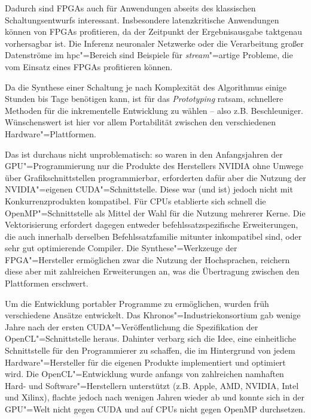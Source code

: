 Dadurch sind FPGAs auch für Anwendungen abseits des klassischen
Schaltungsentwurfs interessant. Insbesondere latenzkritische Anwendungen können
von FPGAs profitieren, da der Zeitpunkt der Ergebnisausgabe taktgenau
vorhersagbar ist.
Die Inferenz neuronaler Netzwerke oder die Verarbeitung großer
Datenströme im \gls{hpc}"=Bereich sind Beispiele für \textit{stream}"=artige
Probleme, die vom Einsatz eines FPGAs profitieren können.

Da die Synthese einer Schaltung je nach Komplexität des Algorithmus einige
Stunden bis Tage benötigen kann, ist für das \textit{Prototyping} ratsam,
schnellere Methoden für die inkrementelle Entwicklung zu wählen -- also z.B.
Beschleuniger. Wünschenswert ist hier vor allem Portabilität zwischen den
verschiedenen Hardware"=Plattformen.

Das ist durchaus nicht unproblematisch: so waren in den Anfangsjahren der
GPU"=Programmierung nur die Produkte des Herstellers NVIDIA ohne Umwege über
Grafikschnittstellen programmierbar, erforderten dafür aber die Nutzung der
NVIDIA"=eigenen CUDA"=Schnittstelle. Diese war (und ist) jedoch nicht mit
Konkurrenzprodukten kompatibel. Für CPUs etablierte sich schnell die
OpenMP"=Schnittstelle als Mittel der Wahl für die Nutzung mehrerer Kerne.
Die Vektorisierung erfordert dagegen entweder befehlssatzspezifische
Erweiterungen, die auch innerhalb derselben Befehlssatzfamilie mitunter
inkompatibel sind, oder sehr gut optimierende Compiler. Die Synthese"=Werkzeuge
der FPGA"=Hersteller ermöglichen zwar die Nutzung der Hochsprachen, reichern
diese aber mit zahlreichen Erweiterungen an, was die Übertragung zwischen den
Plattformen erschwert.

Um die Entwicklung portabler Programme zu ermöglichen, wurden früh verschiedene
Ansätze entwickelt. Das Khronos"=Industriekonsortium gab wenige Jahre nach der
ersten CUDA"=Veröffentlichung die Spezifikation der OpenCL"=Schnittstelle
heraus.
Dahinter verbarg sich die Idee, eine einheitliche Schnittstelle für den
Programmierer zu schaffen, die im Hintergrund von jedem Hardware"=Hersteller für
die eigenen Produkte implementiert und optimiert wird. Die OpenCL"=Entwicklung
wurde anfangs von zahlreichen namhaften Hard- und Software"=Herstellern
unterstützt (z.B. Apple, AMD, NVIDIA, Intel und Xilinx), flachte jedoch nach
wenigen Jahren wieder ab und konnte sich in der GPU"=Welt nicht gegen CUDA
und auf CPUs nicht gegen OpenMP durchsetzen.


